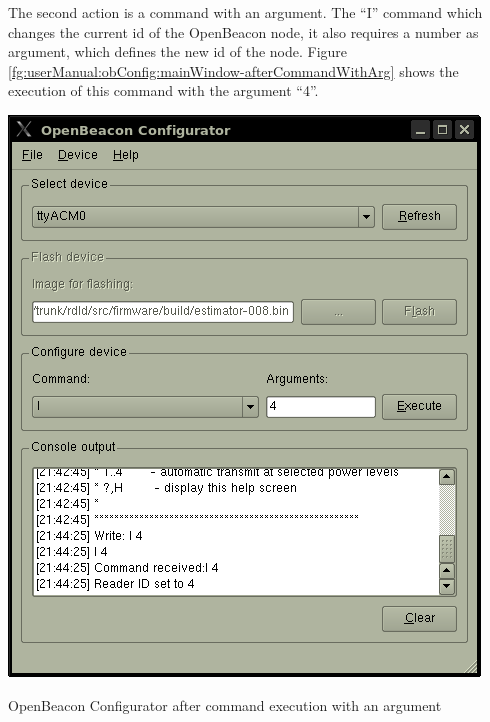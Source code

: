    The second action is a command with an argument. The ``I'' command which changes the current id of the OpenBeacon node, it also requires a number as argument, which defines the new id of the node. Figure \ref{fg:userManual:obConfig:mainWindow-afterCommandWithArg} shows the execution of this command with the argument ``4''.
   \begin{staticFigure}
    \begin{center}
     \includegraphics{images/UserManual/obConfig/mainWindow-afterCommandWithArg.png}
     \caption{OpenBeacon Configurator after command execution with an argument}
     \label{fg:userManual:obConfig:mainWindow-afterCommandWithArg}
    \end{center}
   \end{staticFigure}

